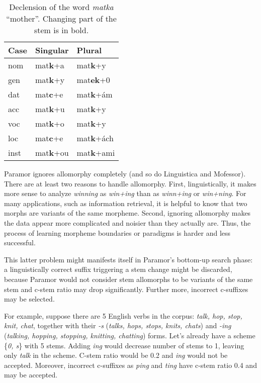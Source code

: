 \documentclass[11pt]{article}
\newcommand{\gloss}[2]{\emph{#1} ``#2''}
\newcommand{\e}[1]{\textit{#1}} %
\begin{document}
\begin{table}[h]
\begin{center}
\begin{tabular}{|l|ll|}
\hline \bf Case & \bf Singular & \bf Plural \\ \hline
nom & mat\textbf{k}+a & mat\textbf{k}+y \\
gen & mat\textbf{k}+y & mat\textbf{ek}+0 \\
dat & mat\textbf{c}+e & mat\textbf{k}+ám\\
acc & mat\textbf{k}+u & mat\textbf{k}+y \\
voc & mat\textbf{k}+o & mat\textbf{k}+y \\
loc & mat\textbf{c}+e & mat\textbf{k}+ách \\
inst & mat\textbf{k}+ou & mat\textbf{k}+ami \\
\hline
\end{tabular}
\end{center}
\caption{\label{table:matka} Declension of the word \gloss{matka}{mother}. Changing part of the stem is in bold.}
\end{table}


Paramor ignores allomorphy completely (and so do Linguistica and Mofessor).
%
There are at least two reasons to handle allomorphy.
%
First, linguistically,
it  makes  more  sense  to  analyze  \e{winning}  as  \e{win+ing} than as  \e{winn+ing} or \e{win+ning}. For  many  applications, such as information retrieval, it is helpful to know that two morphs are variants of the same morpheme.
%
Second, ignoring allomorphy makes the data appear more complicated and noisier than they actually are. Thus, the process of learning morpheme boundaries or paradigms is harder and less successful.

This latter problem might manifests itself in Paramor's bottom-up search phase: a linguistically correct suffix triggering a stem change might be discarded, because Paramor would not consider stem allomorphs to be variants of the same stem and c-stem ratio may drop significantly. Further more, incorrect c-suffixes may be selected.

For example, suppose there are 5 English verbs in the corpus: \emph{talk, hop, stop, knit, chat}, together with their \emph{-s} (\emph{talks, hops, stops, knits, chats}) and \emph{-ing} (\emph{talking, hopping, stopping, knitting, chatting}) forms. Let's already have a scheme \{\emph{0, s}\} with 5 stems. Adding \emph{ing} would decrease number of stems to 1, leaving only \emph{talk} in the scheme. C-stem ratio would be 0.2 and \emph{ing} would not be accepted. Moreover, incorrect c-suffixes as \emph{ping} and \emph{ting} have c-stem ratio 0.4 and may be accepted.
\end{document}
